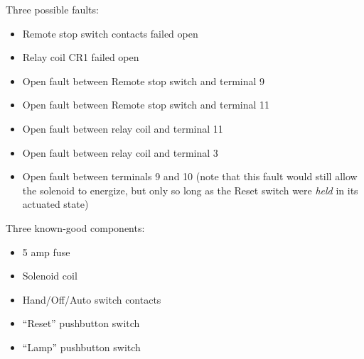 











\noindent
Three possible faults:

\begin{itemize}
\item{} Remote stop switch contacts failed open
\vskip 10pt
\item{} Relay coil CR1 failed open
\vskip 10pt
\item{} Open fault between Remote stop switch and terminal 9
\vskip 10pt
\item{} Open fault between Remote stop switch and terminal 11
\vskip 10pt
\item{} Open fault between relay coil and terminal 11
\vskip 10pt
\item{} Open fault between relay coil and terminal 3
\vskip 10pt
\item{} Open fault between terminals 9 and 10 (note that this fault would still allow the solenoid to energize, but only so long as the Reset switch were {\it held} in its actuated state)
\end{itemize}

\vskip 10pt

\noindent
Three known-good components:

\begin{itemize}
\item{} 5 amp fuse
\vskip 10pt
\item{} Solenoid coil
\vskip 10pt
\item{} Hand/Off/Auto switch contacts
\vskip 10pt
\item{} ``Reset'' pushbutton switch
\vskip 10pt
\item{} ``Lamp'' pushbutton switch
\end{itemize}





